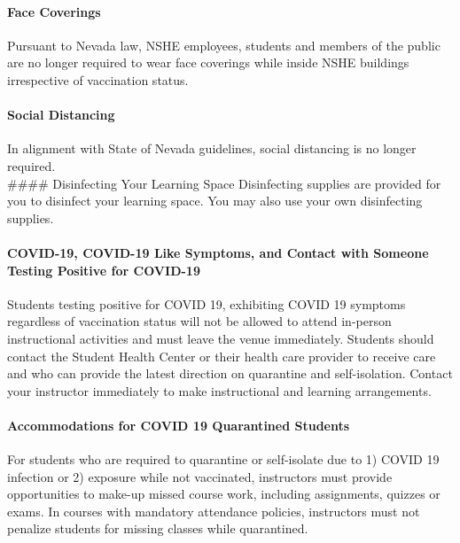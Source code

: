 \documentclass[
]{article}
\begin{document}
\hypertarget{face-coverings}{%
\paragraph{Face Coverings}\label{face-coverings}}

Pursuant to Nevada law, NSHE employees, students and members of the
public are no longer required to wear face coverings while inside NSHE
buildings irrespective of vaccination status.

\hypertarget{social-distancing}{%
\paragraph{Social Distancing}\label{social-distancing}}

In alignment with State of Nevada guidelines, social distancing is no
longer required.\\
\#\#\#\# Disinfecting Your Learning Space Disinfecting supplies are
provided for you to disinfect your learning space. You may also use your
own disinfecting supplies.

\hypertarget{covid-19-covid-19-like-symptoms-and-contact-with-someone-testing-positive-for-covid-19}{%
\paragraph{COVID-19, COVID-19 Like Symptoms, and Contact with Someone
Testing Positive for
COVID-19}\label{covid-19-covid-19-like-symptoms-and-contact-with-someone-testing-positive-for-covid-19}}

Students testing positive for COVID 19, exhibiting COVID 19 symptoms
regardless of vaccination status will not be allowed to attend in-person
instructional activities and must leave the venue immediately. Students
should contact the Student Health Center or their health care provider
to receive care and who can provide the latest direction on quarantine
and self-isolation. Contact your instructor immediately to make
instructional and learning arrangements.

\hypertarget{accommodations-for-covid-19-quarantined-students}{%
\paragraph{Accommodations for COVID 19 Quarantined
Students}\label{accommodations-for-covid-19-quarantined-students}}

For students who are required to quarantine or self-isolate due to 1)
COVID 19 infection or 2) exposure while not vaccinated, instructors must
provide opportunities to make-up missed course work, including
assignments, quizzes or exams. In courses with mandatory attendance
policies, instructors must not penalize students for missing classes
while quarantined.
\end{document}
